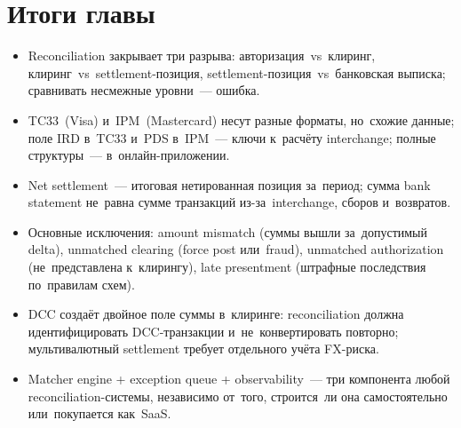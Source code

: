 \section*{Итоги главы}

\begin{itemize}
  \item Reconciliation закрывает три разрыва: авторизация~vs~клиринг,
        клиринг~vs~settlement-позиция, settlement-позиция~vs~банковская
        выписка; сравнивать несмежные уровни~--- ошибка.
  \item TC33~(Visa) и~IPM~(Mastercard) несут разные форматы, но~схожие
        данные; поле IRD в~TC33 и~PDS в~IPM~--- ключи к~расчёту
        interchange; полные структуры~--- в~онлайн-приложении.
  \item Net settlement~--- итоговая нетированная позиция за~период;
        сумма bank statement не~равна сумме транзакций из-за~interchange,
        сборов и~возвратов.
  \item Основные исключения: amount mismatch (суммы вышли за~допустимый
        delta), unmatched clearing (force post или~fraud), unmatched
        authorization (не~представлена к~клирингу), late presentment
        (штрафные последствия по~правилам схем).
  \item DCC создаёт двойное поле суммы в~клиринге: reconciliation
        должна идентифицировать DCC-транзакции и~не~конвертировать
        повторно; мультивалютный settlement требует отдельного учёта
        FX-риска.
  \item Matcher engine + exception queue + observability~--- три
        компонента любой reconciliation-системы, независимо от~того,
        строится~ли она самостоятельно или~покупается как~SaaS.
\end{itemize}
